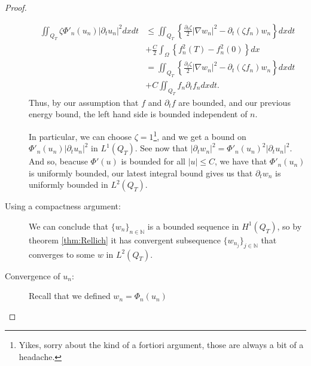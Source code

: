 \documentclass[11pt, a4paper]{article}
\begin{document}
\begin{proof}
\begin{description}
\begin{align*}
	\iint_{Q_T} \zeta \Phi'_n(u_n) |\partial_t u_n|^2 dxdt &\leq \iint_{Q_T} \left\{ \frac{\partial_t \zeta}{2}|\nabla w_n|^2 - \partial_t(\zeta f_n) w_n \right\} dxdt \\
	&+ \frac{C}{2}\int_\Omega \left\{ f_n^2(T) - f_n^2(0) \right\} dx	\\
	&= \iint_{Q_T} \left\{ \frac{\partial_t \zeta}{2}|\nabla w_n|^2 - \partial_t(\zeta f_n) w_n \right\} dxdt \\
	&+ C \iint_{Q_T} f_n\partial_t f_n dxdt.
	\end{align*}
	Thus, by our assumption that $f$ and $\partial_t f$ are bounded, and our previous energy bound, the left hand side is bounded independent of $n$.
	
	In particular, we can choose $\zeta = 1$\footnote{Yikes, sorry about the kind of a fortiori argument, those are always a bit of a headache.}, and we get a bound on $\Phi'_n(u_n)|\partial_t u_n|^2$ in $L^1(Q_T)$. See now that $|\partial_t w_n	|^2 = \Phi'_n(u_n)^2|\partial_t u_n|^2$. And so, beacuse $\Phi'(u)$ is bounded for all $|u| \leq C$, we have that $\Phi'_n(u_n)$ is uniformly bounded, our latest integral bound gives us that $\partial_t w_n$ is uniformly bounded in $L^2(Q_T)$.
	
	\item[Using a compactness argument:] We can conclude that $\{w_n\}_{n \in \mathbb{N}}$ is a bounded sequence in $H^1(Q_T)$, so by theorem \ref{thm:Rellich} it has convergent subsequence $\{w_{n_j}\}_{j \in \mathbb{N}}$ that converges to some $w$ in $L^2(Q_T)$.
	
	\item[Convergence of $u_n$:] Recall that we defined $w_n = \Phi_n(u_n)$
\end{description}


\end{proof}
\end{document}
